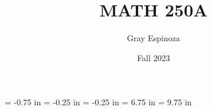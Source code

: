 \usepackage[utf8]{inputenc}
\usepackage{amsmath, amssymb, amsthm}
\usepackage{hyperref}
\usepackage{hyperxmp}
\usepackage{microtype}
\usepackage{mlmodern}
\usepackage{siunitx}

\topmargin = -0.75 in
\evensidemargin = -0.25 in
\oddsidemargin = -0.25 in
\textwidth = 6.75 in
\textheight = 9.75 in
\linespread{1.25}
\setlength\parindent{10pt}

\author{Gray Espinoza}
\title{MATH 250A}
\date{Fall 2023}

\makeatletter
\makeatother
